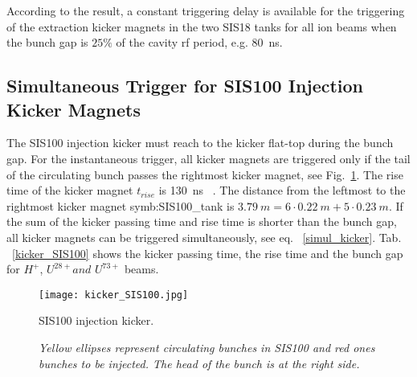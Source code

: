 \begin{table}[H]
\end{table}
According to the result, a constant triggering delay is available for the triggering of the extraction kicker magnets in the two SIS18 tanks for all ion beams when the bunch gap is $25\%$ of the cavity rf period, e.g. \SI{80}{ns}.  

\subsection{Simultaneous Trigger for SIS100 Injection Kicker Magnets}
The SIS100 injection kicker must reach to the kicker flat-top during the bunch gap. For the instantaneous trigger, all kicker magnets are triggered only if the tail of the circulating bunch passes the rightmost kicker magnet, see Fig.~\ref{kicker_SIS1001}. The rise time of the kicker magnet $t_\mathit{rise}$ is \SI{130}{ns} ~\cite{blell_f-ds-ie-03e_2014}. The distance from the leftmost to the rightmost kicker magnet \gls{symb:SIS100_tank} is $\SI{3.79}{m}= 6 \cdot \SI{0.22}{m} + 5 \cdot \SI{0.23}{m}$. If the sum of the kicker passing time and rise time is shorter than the bunch gap, all kicker magnets can be triggered simultaneously, see eq. ~\ref{simul_kicker}. Tab. ~\ref{kicker_SIS100} shows the kicker passing time, the rise time and the bunch gap for $H^+$, $U^{28+} and$ $U^{73+}$ beams. 

\begin{figure}[!htb]
   \centering   
   \texttt{[image: kicker\_SIS100.jpg]}
   \caption{SIS100 injection kicker.}
	\caption*{\textsl{\small{Yellow ellipses represent circulating bunches in SIS100 and red ones bunches to be injected. The head of the bunch is at the right side.}}}
   \label{kicker_SIS1001}
\end{figure}

